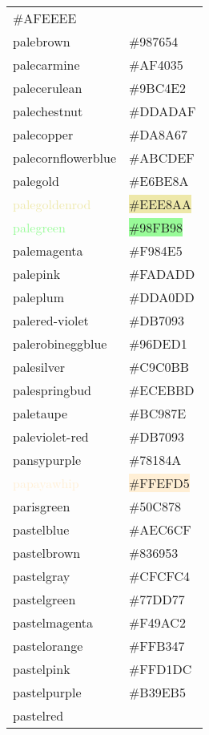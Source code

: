 \documentclass[
]{article}
\begin{document}
\begin{longtable}[]{@{}ll@{}}
\colorbox{paleblue}{\#AFEEEE}\tabularnewline
\textcolor{palebrown}{palebrown} &
\colorbox{palebrown}{\#987654}\tabularnewline
\textcolor{palecarmine}{palecarmine} &
\colorbox{mediumcarmine}{\#AF4035}\tabularnewline
\textcolor{palecerulean}{palecerulean} &
\colorbox{palecerulean}{\#9BC4E2}\tabularnewline
\textcolor{palechestnut}{palechestnut} &
\colorbox{palechestnut}{\#DDADAF}\tabularnewline
\textcolor{palecopper}{palecopper} &
\colorbox{palecopper}{\#DA8A67}\tabularnewline
\textcolor{palecornflowerblue}{palecornflowerblue} &
\colorbox{palecornflowerblue}{\#ABCDEF}\tabularnewline
\textcolor{palegold}{palegold} &
\colorbox{palegold}{\#E6BE8A}\tabularnewline
\textcolor{palegoldenrod}{palegoldenrod} &
\colorbox{palegoldenrod}{\#EEE8AA}\tabularnewline
\textcolor{palegreen}{palegreen} &
\colorbox{palegreen}{\#98FB98}\tabularnewline
\textcolor{palemagenta}{palemagenta} &
\colorbox{palemagenta}{\#F984E5}\tabularnewline
\textcolor{palepink}{palepink} &
\colorbox{palepink}{\#FADADD}\tabularnewline
\textcolor{paleplum}{paleplum} &
\colorbox{mediumlavendermagenta}{\#DDA0DD}\tabularnewline
\textcolor{palered-violet}{palered-violet} &
\colorbox{palered-violet}{\#DB7093}\tabularnewline
\textcolor{palerobineggblue}{palerobineggblue} &
\colorbox{palerobineggblue}{\#96DED1}\tabularnewline
\textcolor{palesilver}{palesilver} &
\colorbox{palesilver}{\#C9C0BB}\tabularnewline
\textcolor{palespringbud}{palespringbud} &
\colorbox{palespringbud}{\#ECEBBD}\tabularnewline
\textcolor{paletaupe}{paletaupe} &
\colorbox{paletaupe}{\#BC987E}\tabularnewline
\textcolor{paleviolet-red}{paleviolet-red} &
\colorbox{palered-violet}{\#DB7093}\tabularnewline
\textcolor{pansypurple}{pansypurple} &
\colorbox{pansypurple}{\#78184A}\tabularnewline
\textcolor{papayawhip}{papayawhip} &
\colorbox{papayawhip}{\#FFEFD5}\tabularnewline
\textcolor{parisgreen}{parisgreen} &
\colorbox{emerald}{\#50C878}\tabularnewline
\textcolor{pastelblue}{pastelblue} &
\colorbox{pastelblue}{\#AEC6CF}\tabularnewline
\textcolor{pastelbrown}{pastelbrown} &
\colorbox{pastelbrown}{\#836953}\tabularnewline
\textcolor{pastelgray}{pastelgray} &
\colorbox{pastelgray}{\#CFCFC4}\tabularnewline
\textcolor{pastelgreen}{pastelgreen} &
\colorbox{pastelgreen}{\#77DD77}\tabularnewline
\textcolor{pastelmagenta}{pastelmagenta} &
\colorbox{pastelmagenta}{\#F49AC2}\tabularnewline
\textcolor{pastelorange}{pastelorange} &
\colorbox{pastelorange}{\#FFB347}\tabularnewline
\textcolor{pastelpink}{pastelpink} &
\colorbox{pastelpink}{\#FFD1DC}\tabularnewline
\textcolor{pastelpurple}{pastelpurple} &
\colorbox{pastelpurple}{\#B39EB5}\tabularnewline
\textcolor{pastelred}{pastelred} &

\end{longtable}
\end{document}
